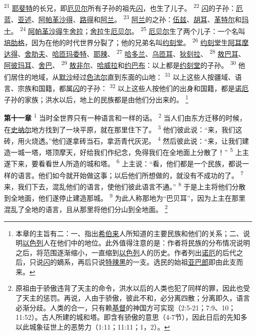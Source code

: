 \textsuperscript{21}
\uline{耶斐特}的长兄，即\uline{厄贝尔}所有子孙的祖先\uline{闪}，也生了儿子。
\textsuperscript{22}
\uline{闪}的子孙：\uline{厄蓝}、\uline{亚述}、\uline{阿帕革}\uline{沙得}、\uline{路得}和\uline{阿兰}。
\textsuperscript{23}
\uline{阿兰}的之孙：\uline{伍兹}、\uline{胡耳}、\uline{革特尔}和\uline{玛士}。
\textsuperscript{24}
\uline{阿帕革}\uline{沙得}生\uline{舍拉}；\uline{舍拉}生\uline{厄贝尔}。
\textsuperscript{25}
\uline{厄贝尔}生了两个儿子：一个名叫\uline{培肋格}，因为在他的时代世界分裂了；他的兄弟名叫\uline{约刻堂}。
\textsuperscript{26}
\uline{约刻堂}生\uline{阿耳}\uline{摩达得}、\uline{舍肋夫}、\uline{哈匝玛委特}、\uline{耶辣}、
\textsuperscript{27}
\uline{哈多兰}、\uline{乌匝耳}、\uline{狄刻拉}、
\textsuperscript{28}
\uline{敖巴耳}、\uline{阿彼玛耳}、\uline{舍巴}、
\textsuperscript{29}
\uline{敖非尔}、\uline{哈威拉}和\uline{约巴布}：以上都是\uline{约刻堂}的子孙。
\textsuperscript{30}
他们居住的地域，从\uline{默沙}经过\uline{色法尔}直到东面的山地：
\textsuperscript{31}
以上这些人按疆域、语言、宗族和国籍，都属\uline{闪}的子孙：
\textsuperscript{32}
以上这些人按他们的出身和国籍，都是\uline{诺厄}子孙的家族；洪水以后，地上的民族都是由他们分出来的。
\footnote{本章的主旨有二：一、指出\uline{希伯来}人所知道的主要民族和他们的关系；二、说明\uline{以色列}人在他们中的地位。此外值得注意的是：作者将民族的分布情况说明之后，将范围逐渐缩小，一直缩到\uline{以色列}人的历史。作者列出\uline{诺厄}的后代之后，只说\uline{闪}的嫡系，再后只说\uline{特辣黑}的一支。选民的始祖\uline{亚巴郎}即由此支而来。}

\textbf{第十一章\quad}
\textsuperscript{1}
当时全世界只有一种语言和一样的话。
\textsuperscript{2}
当人们由东方迁移的时候，在\uline{史纳尔}地方找到了一块平原，就在那里住下了。
\textsuperscript{3}
他们彼此说：“来，我们这砖，用火烧透。”他们遂拿砖当石，拿沥青代灰泥。
\textsuperscript{4}
然后彼此说：“来，让我们建造一城一塔，塔顶摩天，好给我们作纪念，免得我们在全地面上分散了！”
\textsuperscript{5}
上主遂下来，要看看世人所造的城和塔。
\textsuperscript{6}
上主说：“看，他们都是一个民族，都说一样的语言。他们如今就开始做这事；以后他们所想做的，就没有不成功的了。
\textsuperscript{7}
来，我们下去，混乱他们的语言，使他们彼此语言不通。”
\textsuperscript{8}
于是上主将他们分散到全地面，他们遂停止建造那城。
\textsuperscript{9}
为此人称那地为“巴贝耳”，因为上主在那里混乱了全地的语言，且从那里将他们分山到全地面。
\footnote{原祖由于骄傲违背了天主的命令，洪水以后的人类也犯了同样的罪，因此也受了天主的惩罚。再说，人由于骄傲，彼此不和，必分离四散；分离即久，语言必渐分歧。人类的合一，只有赖\uline{基督}的神国方可实现（2:5-21；7:9、10；11:52）。古人所建的城和塔。即含有骄傲的意思（4-7节），因此日后的先知多以此城象征世上的恶势力（1:11；11:11；1，2）。}

